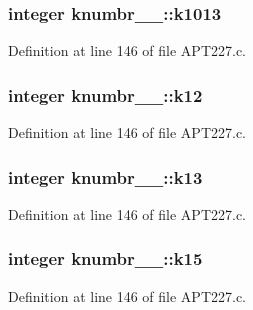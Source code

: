 \subsubsection[{\texorpdfstring{k1013}{k1013}}]{\setlength{\rightskip}{0pt plus 5cm}integer knumbr\+\_\+\_\+\+::k1013}\hypertarget{structknumbr__1___a7d1e4185d4db26dd1be6160b2256d2cf}{}\label{structknumbr__1___a7d1e4185d4db26dd1be6160b2256d2cf}


Definition at line 146 of file A\+P\+T227.\+c.

\subsubsection[{\texorpdfstring{k12}{k12}}]{\setlength{\rightskip}{0pt plus 5cm}integer knumbr\+\_\+\_\+\+::k12}\hypertarget{structknumbr__1___a19aecd53014752bb918ef12446271e8f}{}\label{structknumbr__1___a19aecd53014752bb918ef12446271e8f}


Definition at line 146 of file A\+P\+T227.\+c.

\subsubsection[{\texorpdfstring{k13}{k13}}]{\setlength{\rightskip}{0pt plus 5cm}integer knumbr\+\_\+\_\+\+::k13}\hypertarget{structknumbr__1___aed5b3ba66bb633fc5ee3d7268fb17d96}{}\label{structknumbr__1___aed5b3ba66bb633fc5ee3d7268fb17d96}


Definition at line 146 of file A\+P\+T227.\+c.

\subsubsection[{\texorpdfstring{k15}{k15}}]{\setlength{\rightskip}{0pt plus 5cm}integer knumbr\+\_\+\_\+\+::k15}\hypertarget{structknumbr__1___aeba0db28411b28c32c89db1c2f3fb9a4}{}\label{structknumbr__1___aeba0db28411b28c32c89db1c2f3fb9a4}


Definition at line 146 of file A\+P\+T227.\+c.

